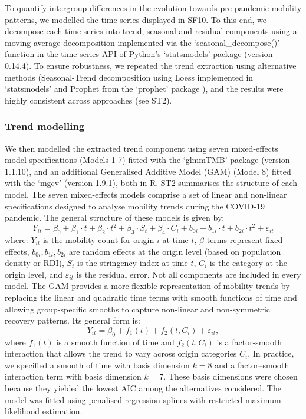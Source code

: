 \documentclass[fleqn,10pt]{wlscirep}
\begin{document}
To quantify intergroup differences in the evolution towards pre-pandemic mobility patterns, we modelled the time series displayed in SF10. To this end, we decompose each time series into trend, seasonal and residual components using a moving-average decomposition implemented via the `seasonal\_decompose()' function in the time-series API of Python’s `statsmodels' package (version 0.14.4). To ensure robustness, we repeated the trend extraction using alternative methods (Seasonal-Trend decomposition using Loess \cite{cleveland1990stl} implemented in `statsmodels' and Prophet from the `prophet' package \cite{prophet17}), and the results were highly consistent across approaches (see ST2). 

\subsubsection*{Trend modelling}

We then modelled the extracted trend component using seven mixed-effects model specifications (Models 1-7) fitted with the `glmmTMB' package (version 1.1.10), and an additional Generalised Additive Model (GAM) (Model 8) fitted with the `mgcv' (version 1.9.1), both in R. ST2 summarises the structure of each model. The seven mixed-effects models comprise a set of linear and non-linear specifications designed to analyse mobility trends during the COVID-19 pandemic. The general structure of these models is given by:
\begin{equation}\label{model-trend}
Y_{it} = \beta_0 + \beta_1 \cdot {t} + \beta_2 \cdot {t}^2 + \beta_3 \cdot S_{t} + \beta_4 \cdot C_i + b_{0i} + b_{1i} \cdot t + b_{2i} \cdot t^2 + \varepsilon_{it}
\end{equation}
where: $Y_{it}$ is the mobility count for origin $i$ at time $t$, $\beta$ terms represent fixed effects, $b_{0i}, b_{1i}, b_{2i}$ are random effects at the origin level (based on population density or RDI), $S_t$ is the stringency index at time $t$, $C_i$ is the category at the origin level, and $\varepsilon_{it}$ is the residual error. Not all components are included in every model. The GAM provides a more flexible representation of mobility trends by replacing the linear and quadratic time terms with smooth functions of time and allowing group-specific smooths to capture non-linear and non-symmetric recovery patterns. Its general form is:
\begin{equation}\label{model-gam}
Y_{it} = \beta_0 + f_1(t) + f_2(t, C_i) + \varepsilon_{it},
\end{equation}
where $f_1(t)$ is a smooth function of time and $f_2(t, C_i)$ is a factor-smooth interaction that allows the trend to vary across origin categories $C_i$. In practice, we specified a smooth of time with basis dimension $k = 8$ and a factor--smooth interaction term with basis dimension $k = 7$. These basis dimensions were chosen because they yielded the lowest AIC among the alternatives considered. The model was fitted using penalised regression splines with restricted maximum likelihood estimation.
\end{document}
